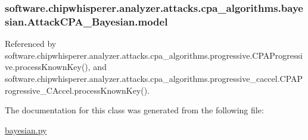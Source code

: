 \hypertarget{classsoftware_1_1chipwhisperer_1_1analyzer_1_1attacks_1_1cpa__algorithms_1_1bayesian_1_1AttackCPA__Bayesian_af022f3198f2e10d86b24c3be60d47c17}{}
\subsubsection[{model}]{\setlength{\rightskip}{0pt plus 5cm}software.\+chipwhisperer.\+analyzer.\+attacks.\+cpa\+\_\+algorithms.\+bayesian.\+Attack\+C\+P\+A\+\_\+\+Bayesian.\+model}\label{classsoftware_1_1chipwhisperer_1_1analyzer_1_1attacks_1_1cpa__algorithms_1_1bayesian_1_1AttackCPA__Bayesian_af022f3198f2e10d86b24c3be60d47c17}


Referenced by software.\+chipwhisperer.\+analyzer.\+attacks.\+cpa\+\_\+algorithms.\+progressive.\+C\+P\+A\+Progressive.\+process\+Known\+Key(), and software.\+chipwhisperer.\+analyzer.\+attacks.\+cpa\+\_\+algorithms.\+progressive\+\_\+caccel.\+C\+P\+A\+Progressive\+\_\+\+C\+Accel.\+process\+Known\+Key().



The documentation for this class was generated from the following file\+:\begin{DoxyCompactItemize}
\item 
\hyperlink{bayesian_8py}{bayesian.\+py}\end{DoxyCompactItemize}
